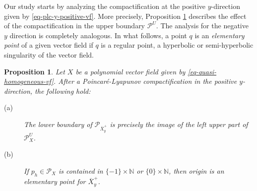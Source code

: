 \documentclass[12pt]{amsart}
\newtheorem{proposition}[theorem]{Proposition}
\begin{document}
Our study starts by analyzing the compactification at the positive $y$-direction given by \eqref{eq-plc-y-positive-vf}. More precisely, Proposition \ref{prop-plc-y-dir} describes the effect of the compactification in the upper boundary $\mathcal{P}^{U}$. The analysis for the negative $y$ direction is completely analogous. In what follows, a point $q$ is an \emph{elementary point} of a given vector field if $q$ is a regular point, a hyperbolic or semi-hyperbolic singularity of the vector field.

\begin{proposition}\label{prop-plc-y-dir}
Let $X$ be a polynomial vector field given by \eqref{eq-quasi-homogeneous-vf}. After a Poincaré-Lyapunov compactification in the positive $y$-direction, the following hold:
\begin{description}
    \item[(a)] The lower boundary of $\mathcal{P}_{\overline{X}^{+}_{y}}$  is precisely the image of the left upper part of $\mathcal{P}^{U}_{X}$.
    \item[(b)] If $p_{h}\in\mathcal{P}_{X}$ is contained in $\{-1\}\times\mathbb{N}$ or $\{0\}\times\mathbb{N}$, then origin is an elementary point for $\overline{X}^{+}_{y}$.
\end{description}

\end{proposition}
\end{document}
